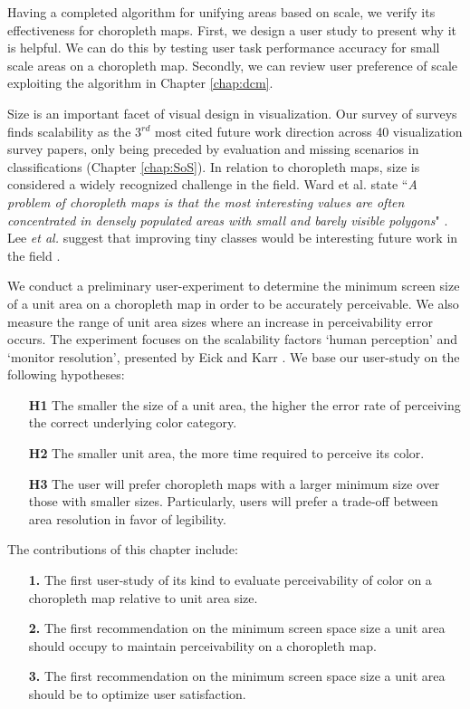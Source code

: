Having a completed algorithm for unifying areas based on scale, we verify its effectiveness for choropleth maps. First, we design a user study to present why it is helpful. We can do this by testing user task performance accuracy for small scale areas on a choropleth map. Secondly, we can review user preference of scale exploiting the algorithm in Chapter \ref{chap:dcm}.

Size is an important facet of visual design in visualization. Our survey of surveys finds scalability as the 3$^{rd}$ most cited future work direction across 40 visualization survey papers, only being preceded by evaluation and missing scenarios in classifications (Chapter \ref{chap:SoS}). In relation to choropleth maps, size is considered a widely recognized challenge in the field. Ward et al. state ``\textit{A problem of choropleth maps is that the most interesting values are often concentrated in densely populated areas with small and barely visible polygons}" \cite{ward2010interactive}. Lee \textit{et al.} suggest that improving tiny classes would be interesting future work in the field \cite{lee2013perceptually}.

We conduct a preliminary user-experiment to determine the minimum screen size of a unit area on a choropleth map in order to be accurately perceivable. We also measure the range of unit area sizes where an increase in perceivability error occurs. The experiment focuses on the scalability factors `human perception' and `monitor resolution', presented by Eick and Karr \cite{eick2002visual}.  We base our user-study on the following hypotheses:
\begin{itemize}[labelindent=1em, labelsep=0.2cm, leftmargin=*]
\item[\textbf{H1}]The smaller the size of a unit area, the higher the error rate of perceiving the correct underlying color category.
\item[\textbf{H2}]The smaller unit area, the more time required to perceive its color.
\item[\textbf{H3}]The user will prefer choropleth maps with a larger minimum size over those with smaller sizes. Particularly, users will prefer a trade-off between area resolution in favor of legibility.
\end{itemize}

The contributions of this chapter include:
\begin{itemize}[labelindent=1em, labelsep=0.2cm, leftmargin=*]
\item[\textbf{1.}] The first user-study of its kind to evaluate perceivability of color on a choropleth map relative to unit area size.
\item[\textbf{2.}] The first recommendation on the minimum screen space size a unit area should occupy to maintain perceivability on a choropleth map.
\item[\textbf{3.}] The first recommendation on the minimum screen space size a unit area should be to optimize user satisfaction.
\end{itemize}

